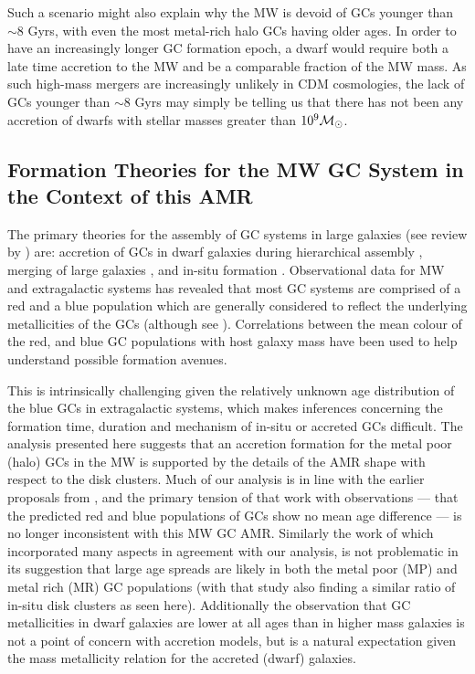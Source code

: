 \documentclass[useAMS,usenatbib]{mn2e}
\newcommand\msol{{{\cal M}_\odot}}
\begin{document}
Such a scenario might also explain why the MW is devoid of GCs younger than
$\sim 8$ Gyrs, with even the most metal-rich halo GCs having older ages.  In
order to have an increasingly longer GC formation epoch, a dwarf would require
both a late time accretion to the MW and be a comparable fraction of the MW
mass.  As such high-mass mergers are increasingly unlikely in CDM cosmologies,
the lack of GCs younger than $\sim 8$ Gyrs may simply be telling us that there
has not been any accretion of dwarfs with stellar masses greater than
$10^{9} \msol$.

\subsection{Formation Theories for the 
MW GC System in the Context of this AMR}
The primary theories for the assembly of GC systems 
in large galaxies (see review by \citealt{Brodie06}) are:
accretion of GCs in dwarf galaxies 
during hierarchical assembly \citep{Cote98},
merging of large galaxies \citep{Ashman92},
and in-situ formation \citep{Forbes97}.
Observational data for MW and extragalactic systems has revealed that
most GC systems are comprised of a red and a blue population which
are generally considered to reflect the underlying metallicities
of the GCs (although see \citealt{Yoon11,Blakeslee12}).
Correlations between the mean colour 
of the red, and blue GC populations with host galaxy mass have been used
to help understand possible formation avenues.

This is intrinsically challenging given the relatively
unknown age distribution
of the blue GCs in extragalactic systems, which makes inferences
concerning the formation time, duration and mechanism of in-situ or accreted
GCs difficult.  The analysis presented here suggests that an accretion
formation for the metal poor (halo) GCs in the MW is supported by
the details of the AMR shape with respect to the disk clusters.
Much of our analysis is in line with the earlier proposals from
\cite{Cote98}, and the primary tension of that work with observations 
--- that the predicted red and blue populations of GCs show no mean
age difference --- is no longer inconsistent with this MW GC AMR.
Similarly the work of \cite{Muratov10} which incorporated many
aspects in agreement with our analysis, is not problematic in 
its suggestion that large age spreads are likely in both the
metal poor (MP) and metal rich (MR) GC populations 
(with that study also finding a similar ratio of in-situ disk clusters 
as seen here).
Additionally the observation that GC metallicities in dwarf galaxies
are lower at all ages than in higher mass galaxies \citep{Strader05}
is not a point of concern with accretion models, 
but is a natural expectation given the
mass metallicity relation for the accreted (dwarf) galaxies.
\end{document}
